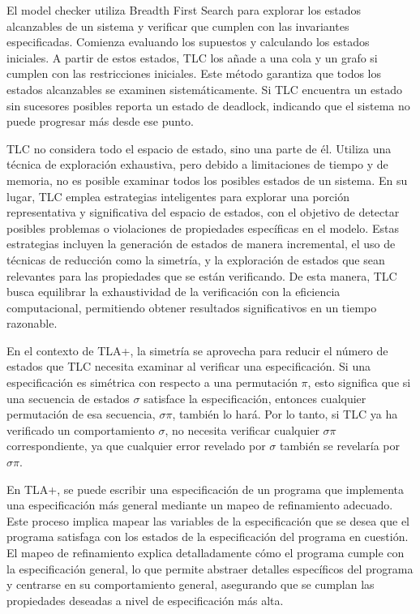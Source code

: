 \documentclass[runningheads]{llncs}
\begin{document}
El model checker utiliza Breadth First Search para explorar los estados alcanzables de un sistema y verificar que cumplen con las invariantes especificadas. Comienza evaluando los supuestos y calculando los estados iniciales. A partir de estos estados, TLC los añade a una cola y un grafo si cumplen con las restricciones iniciales. Este método garantiza que todos los estados alcanzables se examinen sistemáticamente. Si TLC encuentra un estado sin sucesores posibles reporta un estado de deadlock, indicando que el sistema no puede progresar más desde ese punto.

TLC no considera todo el espacio de estado, sino una parte de él. Utiliza una técnica de exploración exhaustiva, pero debido a limitaciones de tiempo y de memoria, no es posible examinar todos los posibles estados de un sistema. En su lugar, TLC emplea estrategias inteligentes para explorar una porción representativa y significativa del espacio de estados, con el objetivo de detectar posibles problemas o violaciones de propiedades específicas en el modelo. Estas estrategias incluyen la generación de estados de manera incremental, el uso de técnicas de reducción como la simetría, y la exploración de estados que sean relevantes para las propiedades que se están verificando. De esta manera, TLC busca equilibrar la exhaustividad de la verificación con la eficiencia computacional, permitiendo obtener resultados significativos en un tiempo razonable.

En el contexto de TLA+, la simetría se aprovecha para reducir el número de estados que TLC necesita examinar al verificar una especificación. Si una especificación es simétrica con respecto a una permutación $\pi$, esto significa que si una secuencia de estados $\sigma$ satisface la especificación, entonces cualquier permutación de esa secuencia, $\sigma\pi$, también lo hará. Por lo tanto, si TLC ya ha verificado un comportamiento $\sigma$, no necesita verificar cualquier $\sigma\pi$ correspondiente, ya que cualquier error revelado por $\sigma$ también se revelaría por $\sigma\pi$.

En TLA+, se puede escribir una especificación de un programa que implementa una especificación más general mediante un mapeo de refinamiento adecuado. Este proceso implica mapear las variables de la especificación que se desea que el programa satisfaga con los estados de la especificación del programa en cuestión. El mapeo de refinamiento explica detalladamente cómo el programa cumple con la especificación general, lo que permite abstraer detalles específicos del programa y centrarse en su comportamiento general, asegurando que se cumplan las propiedades deseadas a nivel de especificación más alta.
\end{document}

